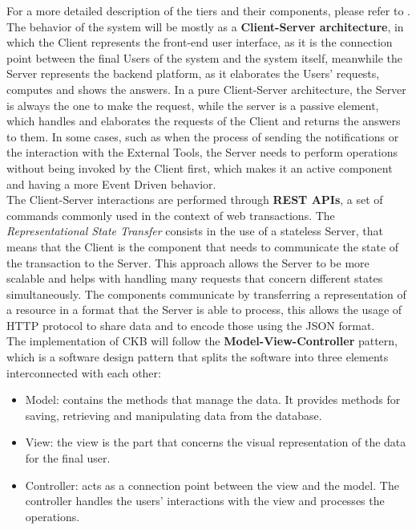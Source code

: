 For a more detailed description of the tiers and their components, please refer to .\\
The behavior of the system will be mostly as a \textbf{Client-Server architecture}, in which the Client represents the front-end user interface, as it is the connection point between the final Users of the system and the system itself, meanwhile the Server represents the backend platform, as it elaborates the Users’ requests, computes and shows the answers. In a pure Client-Server architecture, the Server is always the one to make the request, while the server is a passive element, which handles and elaborates the requests of the Client and returns the answers to them. In some cases, such as when the process of sending the notifications or the interaction with the External Tools, the Server needs to perform operations without being invoked by the Client first, which makes it an active component and having a more Event Driven behavior.
\\
The Client-Server interactions are performed through \textbf{REST APIs}, a set of commands commonly used in the context of web transactions. The \textit{Representational State Transfer} consists in the use of a stateless Server, that means that the Client is the component that needs to communicate the state of the transaction to the Server. This approach allows the Server to be more scalable and helps with handling many requests that concern different states simultaneously. The components communicate by transferring a representation of a resource in a format that the Server is able to process, this allows the usage of HTTP protocol to share data and to encode those using the JSON format.
\\
The implementation of CKB will follow the \textbf{Model-View-Controller} pattern, which is a software design pattern that splits the software into three elements interconnected with each other: 
\begin{itemize}
    \item Model: contains the methods that manage the data. It provides methods for saving, retrieving and manipulating data from the database.
    \item View: the view is the part that concerns the visual representation of the data for the final user.
    \item Controller: acts as a connection point between the view and the model. The controller handles the users’ interactions with the view and processes the operations.
\end{itemize}

